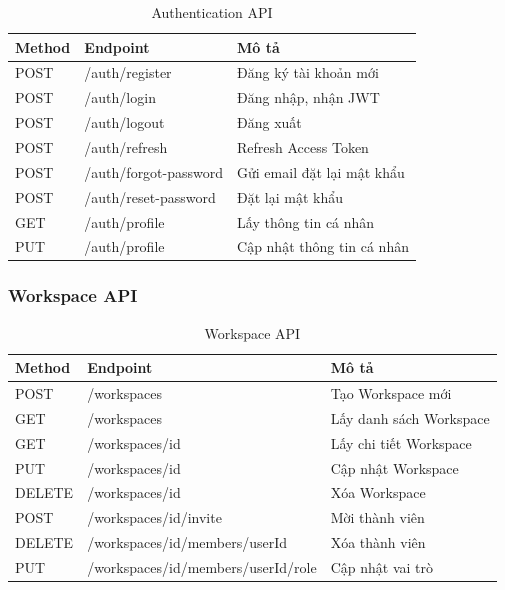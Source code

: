 \documentclass[12pt,a4paper]{report}
\begin{document}
\begin{table}[H]
\centering
\caption{Authentication API}
\begin{tabular}{|p{2.5cm}|p{4cm}|p{8cm}|}
\hline
\textbf{Method} & \textbf{Endpoint} & \textbf{Mô tả} \\
\hline
POST & /auth/register & Đăng ký tài khoản mới \\
\hline
POST & /auth/login & Đăng nhập, nhận JWT \\
\hline
POST & /auth/logout & Đăng xuất \\
\hline
POST & /auth/refresh & Refresh Access Token \\
\hline
POST & /auth/forgot-password & Gửi email đặt lại mật khẩu \\
\hline
POST & /auth/reset-password & Đặt lại mật khẩu \\
\hline
GET & /auth/profile & Lấy thông tin cá nhân \\
\hline
PUT & /auth/profile & Cập nhật thông tin cá nhân \\
\hline
\end{tabular}
\label{tab:auth_api}
\end{table}

\subsubsection{Workspace API}

\begin{table}[H]
\centering
\caption{Workspace API}
\begin{tabular}{|p{2.5cm}|p{4cm}|p{8cm}|}
\hline
\textbf{Method} & \textbf{Endpoint} & \textbf{Mô tả} \\
\hline
POST & /workspaces & Tạo Workspace mới \\
\hline
GET & /workspaces & Lấy danh sách Workspace \\
\hline
GET & /workspaces/{id} & Lấy chi tiết Workspace \\
\hline
PUT & /workspaces/{id} & Cập nhật Workspace \\
\hline
DELETE & /workspaces/{id} & Xóa Workspace \\
\hline
POST & /workspaces/{id}/invite & Mời thành viên \\
\hline
DELETE & /workspaces/{id}/members/{userId} & Xóa thành viên \\
\hline
PUT & /workspaces/{id}/members/{userId}/role & Cập nhật vai trò \\
\hline
\end{tabular}
\label{tab:workspace_api}
\end{table}
\end{document}
